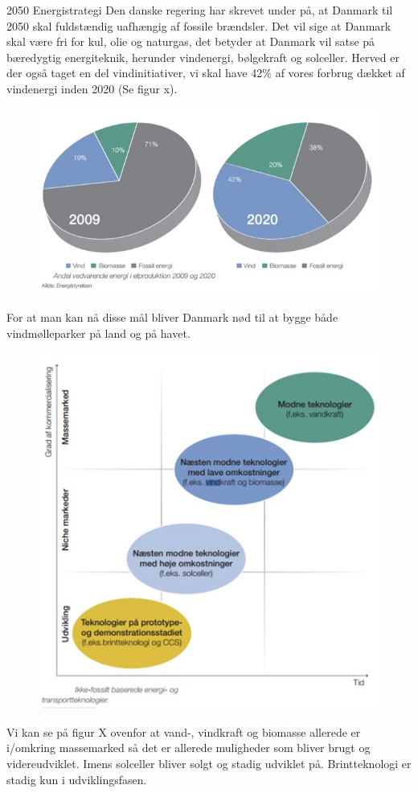 2050 Energistrategi
Den danske regering har skrevet under på, at Danmark til 2050 skal fuldstændig uafhængig af fossile brændsler. Det vil sige at Danmark skal være fri for kul, olie og naturgas, det betyder at Danmark vil satse på bæredygtig energiteknik, herunder vindenergi, bølgekraft og solceller. Herved er der også taget en del vindinitiativer, vi skal have 42\% af vores forbrug dækket af vindenergi inden 2020 (Se figur x).
\begin{figure}[H]
\includegraphics[scale=0.5]{Billeder/Cirkeldiagram_probana}
\end{figure}
For at man kan nå disse mål bliver Danmark nød til at bygge både vindmølleparker på land og på havet.
\begin{figure}[H]
\includegraphics[scale=0.5]{Billeder/Baeredygtige_energiiniti}
\end{figure}
Vi kan se på figur X ovenfor at vand-, vindkraft og biomasse allerede er i/omkring massemarked så det er allerede muligheder som bliver brugt og videreudviklet. Imens solceller bliver solgt og stadig udviklet på. Brintteknologi er stadig kun i udviklingsfasen. 